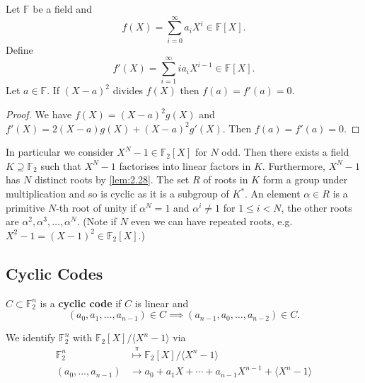 \documentclass{article}
\newcommand{\F}{\mathbb{F}}
\newcommand{\1}[1]{\mathbbm{1}_{#1}}
\begin{document}
\begin{nlemma}\label{lem:2.28}
    Let $\F$ be a field and \begin{equation*}f(X) = \sum_{i=0}^\infty a_i X^i \in \F[X].\end{equation*}
    Define \begin{equation*}f'(X) = \sum_{i=1}^\infty i a_i X^{i-1} \in \F[X].\end{equation*}
    Let $a \in \F$. If $(X-a)^2$ divides $f(X)$ then $f(a) = f'(a) = 0$.
\end{nlemma}
\begin{proof}
    We have $f(X) = (X-a)^2 g(X)$ and $f'(X) = 2(X-a)g(X) + (X-a)^2 g'(X)$. Then $f(a) = f'(a) = 0$.
\end{proof}

In particular we consider $X^N - 1 \in \F_2[X]$ for $N$ odd.
Then there exists a field $K \supseteq \F_2$ such that $X^N - 1$ factorises into linear factors in $K$.
Furthermore, $X^N - 1$ has $N$ distinct roots by \cref{lem:2.28}.
The set $R$ of roots in $K$ form a group under multiplication and so is cyclic as it is a subgroup of $K^*$.
An element $\alpha \in R$ is a primitive $N$-th root of unity if $\alpha^N=1$ and $\alpha^i \neq 1$ for $1 \leq i < N$, the other roots are $\alpha^2, \alpha^3, \dotsc, \alpha^N$.
(Note if $N$ even we can have repeated roots, e.g.\ $X^2 - 1 = (X-1)^2 \in \F_2[X]$.)

\subsection{Cyclic Codes}
\begin{defi}
    $C \subset \F_2^n$ is a \textbf{cyclic code} if $C$ is linear and
    \begin{equation*}
        (a_0, a_1, \dotsc, a_{n-1}) \in C \implies (a_{n-1}, a_0, \dotsc, a_{n-2}) \in C.
    \end{equation*}
\end{defi}
We identify $\F_2^n$ with $\F_2[X]/\langle X^n - 1 \rangle$ via
\begin{align*}
    \F_2^n &\overset{\pi}{\longmapsto} \F_2[X]/\langle X^n - 1 \rangle \\
    (a_0, \dotsc, a_{n-1}) &\longrightarrow a_0 + a_1 X + \dotsb + a_{n-1} X^{n-1} + \langle X^n - 1 \rangle
\end{align*}
\end{document}
